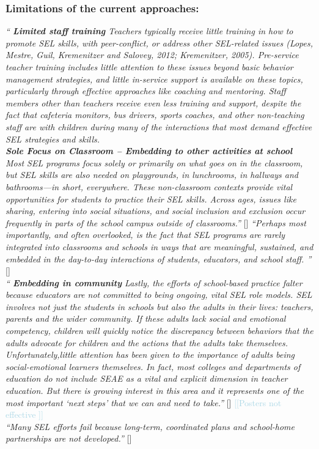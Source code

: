 \documentclass[prodmode,acmtochi]{acmsmall}
\newcommand{\todo}[1]{\textrm{\textrm{\textcolor{LightBlue}{[[#1]]} } } }
\newcommand{\qq}[2]{\textrm{\textit{``#2''}}{ [#1]}}
\begin{document}
\subsubsection{Limitations of the current approaches:}
\qq{\cite[p.7]{jones2012social}}{
{\bf Limited staff training} Teachers typically receive little training in how to promote SEL skills, with peer-conflict, or address other SEL-related issues (Lopes, Mestre, Guil, Kremenitzer and Salovey, 2012; Kremenitzer, 2005). Pre-service teacher training includes little attention to these issues beyond basic behavior management strategies, and little in-service support is available on these topics, particularly through effective approaches like coaching and mentoring. Staff members other than teachers receive even less training and support, despite the fact that cafeteria monitors, bus drivers, sports coaches, and other non-teaching staff are with children during many of the interactions that most demand effective SEL strategies and skills.
\\
{\bf Sole Focus on Classroom -- Embedding to other activities at school} Most SEL programs focus solely or primarily on what goes on in the classroom, but SEL skills are also needed on playgrounds, in lunchrooms, in hallways and bathrooms—in short, everywhere. These non-classroom contexts provide vital opportunities for students to practice their SEL skills. Across ages, issues like sharing, entering into social situations, and social inclusion and exclusion occur frequently in parts of the school campus outside of classrooms.}
\qq{\cite{jones2012social}}{Perhaps most importantly, and often overlooked, is the fact that SEL programs are rarely integrated into classrooms and schools in ways that are meaningful, sustained, and embedded in the day-to-day interactions of students, educators, and school staff. }
\\
\qq{\cite[p.71]{Maree2007}}{
{\bf Embedding in community} Lastly, the efforts of school-based practice falter because educators are not committed to being ongoing, vital SEL role models. SEL involves not just the students in schools but also the adults in their lives: teachers, parents and the wider community. If these adults lack social and emotional competency, children will quickly notice the discrepancy between behaviors that the adults advocate for children and the actions that the adults take themselves. Unfortunately,little attention has been given to the importance of adults being social-emotional learners themselves. In fact, most colleges and departments of education do not include SEAE as a vital and explicit dimension in teacher education. But there is growing interest in this area and it represents one of the most important ‘next steps’ that we can and need to take.} \todo{Posters not effective \cite{Cohen2006}}
\\
\qq{\cite[p.70]{Maree2007}}{Many SEL efforts fail because long-term, coordinated plans and school-home partnerships are not developed.}
\\
\end{document}
